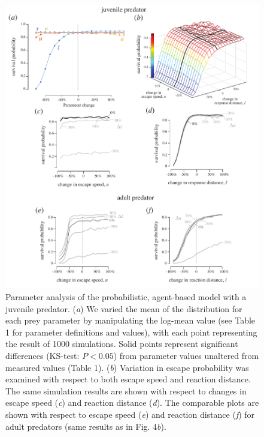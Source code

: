 \documentclass[11pt]{article}
\begin{document}
\linespread{1}\selectfont %


\begin{figure}[!h]
\centering
	\includegraphics[width=5.5in]{supp_sense}
\caption{Parameter analysis of the probabilistic, agent-based model with a juvenile predator. 
(\textit{a}) We varied the mean of the distribution for each prey parameter by manipulating the log-mean value (see Table 1 for parameter definitions and values), with each point representing the result of 1000 simulations. 
Solid points represent significant differences (KS-test: $P < 0.05$) from parameter values unaltered from measured values (Table 1).
(\textit{b}) Variation in escape probability was examined with respect to both escape speed and reaction distance.
The same simulation results are shown with respect to changes in escape speed (\textit{c}) and reaction distance (\textit{d}).
The comparable plots are shown with respect to escape speed (\textit{e}) and reaction distance (\textit{f}) for adult predators (same results as in Fig. 4\textit{b}).
}
\label{fig_sense}
\end{figure}
\end{document}
